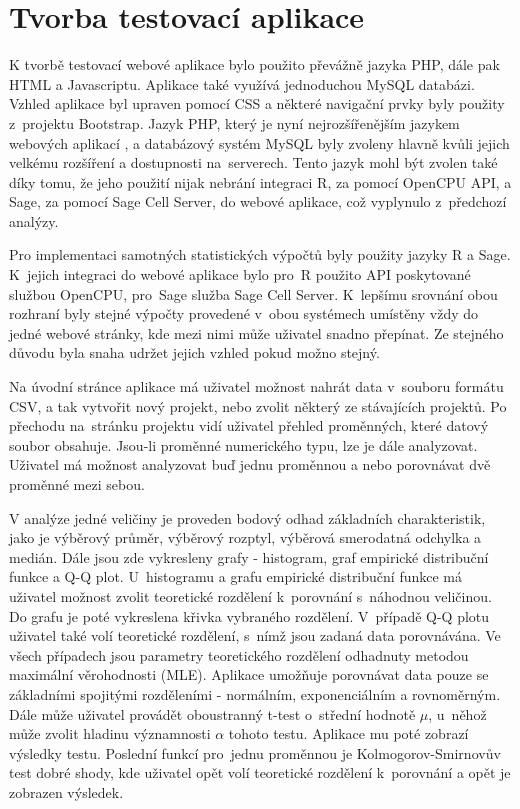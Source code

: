 \documentclass[thesis=B,czech]{FITthesis}[2012/06/26]
\begin{document}
\chapter{Tvorba testovací aplikace}
K tvorbě testovací webové aplikace bylo použito převážně jazyka PHP, dále pak HTML a Javascriptu. Aplikace také využívá jednoduchou MySQL databázi. Vzhled aplikace byl upraven pomocí CSS a některé navigační prvky byly použity z~projektu Bootstrap. 
Jazyk PHP, který je nyní nejrozšířenějším jazykem webových aplikací \cite{PHP}, a databázový systém MySQL byly zvoleny hlavně kvůli jejich velkému rozšíření a dostupnosti na~serverech. Tento jazyk mohl být zvolen také díky tomu, že jeho použití nijak nebrání integraci R, za pomocí OpenCPU API, a Sage, za pomocí Sage Cell Server, do webové aplikace, což vyplynulo z~předchozí analýzy.

Pro implementaci samotných statistických výpočtů byly použity jazyky R a Sage. K~jejich integraci do webové aplikace bylo pro~R použito API poskytované službou OpenCPU, pro~Sage služba Sage Cell Server. K~lepšímu srovnání obou rozhraní byly stejné výpočty provedené v~obou systémech umístěny vždy do jedné webové stránky, kde mezi nimi může uživatel snadno přepínat. Ze stejného důvodu byla snaha udržet jejich vzhled pokud možno stejný.

Na úvodní stránce aplikace má uživatel možnost nahrát data v~souboru formátu CSV, a tak vytvořit nový projekt, nebo zvolit některý ze stávajících projektů. Po přechodu na~stránku projektu vidí uživatel přehled proměnných, které datový soubor obsahuje. Jsou-li proměnné numerického typu, lze je dále analyzovat. Uživatel má možnost analyzovat buď jednu proměnnou a nebo porovnávat dvě proměnné mezi sebou. 

V analýze jedné veličiny je proveden bodový odhad základních charakteristik, jako je výběrový průměr, výběrový rozptyl, výběrová smerodatná odchylka a medián. Dále jsou zde vykresleny grafy - histogram, graf empirické distribuční funkce a Q-Q plot. U~histogramu a grafu empirické distribuční funkce má uživatel možnost zvolit teoretické rozdělení k~porovnání s~náhodnou veličinou. Do grafu je poté vykreslena křivka vybraného rozdělení. V~případě Q-Q plotu uživatel také volí teoretické rozdělení, s~nímž jsou zadaná data porovnávána. Ve všech případech jsou parametry teoretického rozdělení odhadnuty metodou maximální věrohodnosti (MLE). Aplikace umožňuje porovnávat data pouze se základními spojitými rozděleními - normálním, exponenciálním a rovnoměrným. Dále může uživatel provádět oboustranný t-test o~střední hodnotě $\mu$, u~něhož může zvolit hladinu významnosti $\alpha$ tohoto testu. Aplikace mu poté zobrazí výsledky testu. Poslední funkcí pro~jednu proměnnou je Kolmogorov-Smirnovův test dobré shody, kde uživatel opět volí teoretické rozdělení k~porovnání a opět je zobrazen výsledek.
\end{document}

